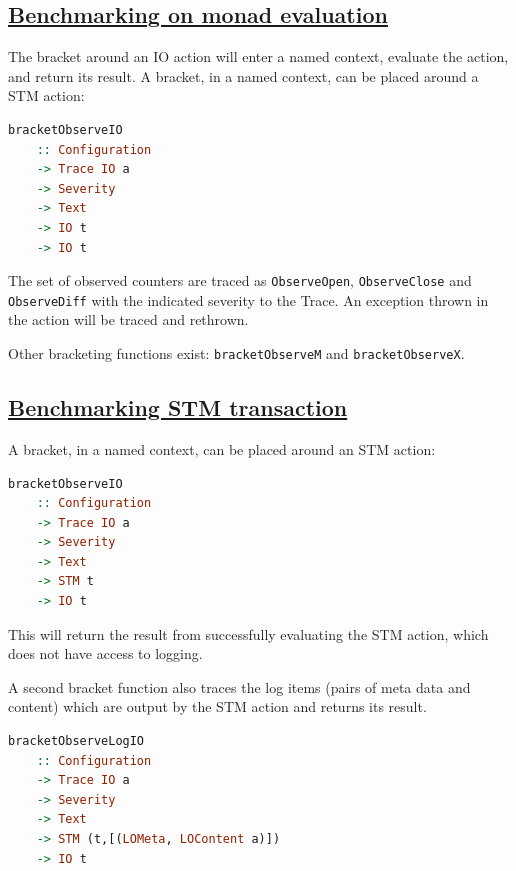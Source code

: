 \begin{mdframed}
    \section*{\href{https://github.com/input-output-hk/iohk-monitoring-framework/blob/master/iohk-monitoring/src/Cardano/BM/Observer/Monadic.lhs}{Benchmarking on monad evaluation}}

The bracket around an IO action will enter a named context, evaluate the action, and return its result. A bracket, in a named context, can be placed around a STM action:

    \begin{lstlisting}[language=Haskell]
bracketObserveIO
    :: Configuration
    -> Trace IO a
    -> Severity
    -> Text
    -> IO t
    -> IO t
    \end{lstlisting}

The set of observed counters are traced as \texttt{ObserveOpen}, \texttt{ObserveClose} and \texttt{ObserveDiff} with the indicated severity to the Trace. An exception thrown in the action will be traced and rethrown.

Other bracketing functions exist: \texttt{bracketObserveM} and \texttt{bracketObserveX}.
\end{mdframed}

\begin{mdframed}

    \section*{\href{https://github.com/input-output-hk/iohk-monitoring-framework/blob/master/iohk-monitoring/src/Cardano/BM/Observer/STM.lhs}{Benchmarking STM transaction}}

A bracket, in a named context, can be placed around an STM action:

    \begin{lstlisting}[language=Haskell]
bracketObserveIO
    :: Configuration
    -> Trace IO a
    -> Severity
    -> Text
    -> STM t
    -> IO t
    \end{lstlisting}

This will return the result from successfully evaluating the STM action, which does not have access to logging.

A second bracket function also traces the log items (pairs of meta data and content) which are output by the STM action and returns its result.

    \begin{lstlisting}[language=Haskell]
bracketObserveLogIO
    :: Configuration
    -> Trace IO a
    -> Severity
    -> Text
    -> STM (t,[(LOMeta, LOContent a)])
    -> IO t
    \end{lstlisting}
\end{mdframed}


